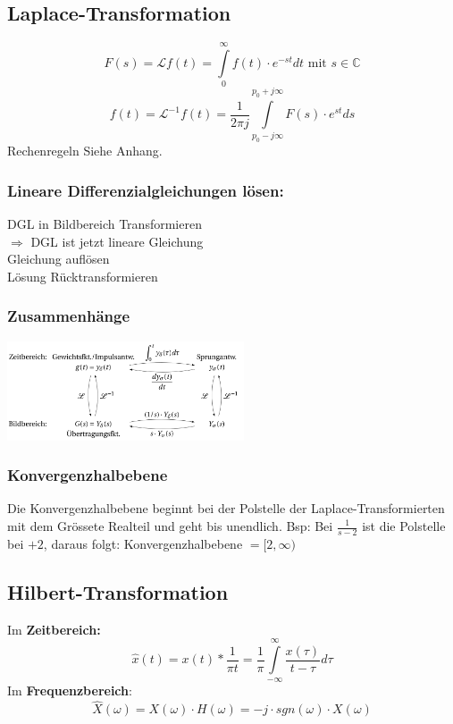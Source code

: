 \subsection{Laplace-Transformation}
\begin{multicols}{2}

  $$F(s) = \mathscr{L} {f(t)} = \int \limits _{0} ^{\infty} f(t) \cdot e^{-st} dt \textrm{ mit } s \in \mathbb{C}$$
  $$f(t) = \mathscr{L}^{-1} {f(t)} = \frac{1}{2\pi j} \int \limits _{p_0-j\infty} ^{p_0 + j\infty} F(s) \cdot e^{st} ds$$
  Rechenregeln Siehe Anhang.
  \subsubsection*{Lineare Differenzialgleichungen lösen:}
  DGL in Bildbereich Transformieren \\ $\Rightarrow$ DGL ist jetzt lineare Gleichung
  \\Gleichung auflösen
  \\Lösung Rücktransformieren

  \subsubsection*{Zusammenhänge}
  \includegraphics[width = 7cm]{include/Integraltransformationen/img/Zusammenhang_Laplace.png}

  \subsubsection*{Konvergenzhalbebene}
  Die Konvergenzhalbebene beginnt bei der Polstelle der Laplace-Transformierten mit dem Grössete Realteil und geht bis unendlich.
  \newline Bsp: Bei $\frac{1}{s-2}$ ist die Polstelle bei $+2$, daraus folgt: Konvergenzhalbebene $= [2,\infty)$
\end{multicols}

\subsection{Hilbert-Transformation}
\begin{multicols}{2}
  Im \textbf{Zeitbereich:}
  $$\hat{x}(t) = x(t) * \frac{1}{\pi t} = \frac{1}{\pi} \int \limits _{-\infty} ^{\infty} \frac{x(\tau)}{t-\tau} d\tau$$
  Im \textbf{Frequenzbereich}:
  $$\hat{X}(\omega) = X(\omega) \cdot H(\omega) = -j \cdot sgn(\omega) \cdot X(\omega)$$
\end{multicols}
